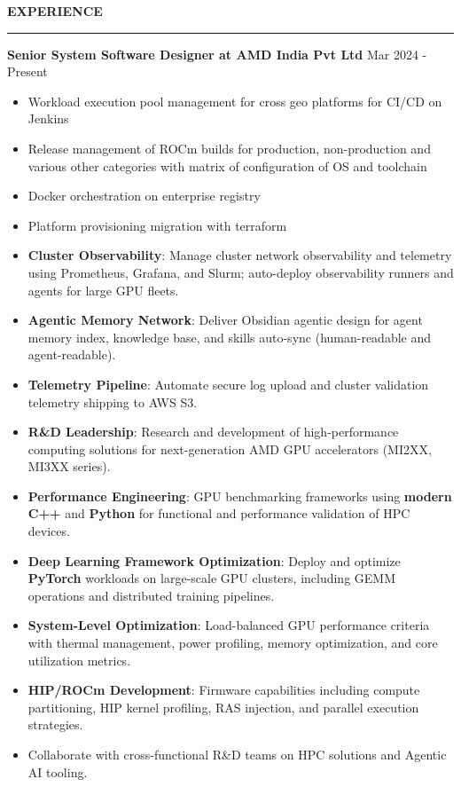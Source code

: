 \documentclass{resume} %
\renewenvironment{rSection}[1]{ %
  \sectionskip
  \textcolor{primaryColor}{\MakeUppercase{\bf #1}} %
  \sectionlineskip
  {\color{primaryColor}\hrule} %
  \begin{list}{}{ %
    \setlength{\leftmargin}{1.5em} %
  }
  \item[]
}{
  \end{list}
}
\begin{document}
\begin{rSection}{Experience}

{\textbf{\textcolor{accentColor}{Senior System Software Designer at AMD India Pvt Ltd}}} \hfill {Mar 2024 - Present }
\begin{itemize}
\if{}
    \item Workload execution pool management for cross geo platforms for CI/CD on Jenkins
    \item Release management of ROCm builds for production, non-production and various other categories with matrix of configuration of OS and toolchain
    \item Docker orchestration on enterprise registry
    \item Platform provisioning migration with terraform
\fi
    \item \textbf{Cluster Observability}: Manage cluster network observability and telemetry using Prometheus, Grafana, and Slurm; auto-deploy observability runners and agents for large GPU fleets.
    \item \textbf{Agentic Memory Network}: Deliver Obsidian agentic design for agent memory index, knowledge base, and skills auto-sync (human-readable and agent-readable).
    \item \textbf{Telemetry Pipeline}: Automate secure log upload and cluster validation telemetry shipping to AWS S3.
    \item \textbf{R\&D Leadership}: Research and development of high-performance computing solutions for next-generation AMD GPU accelerators (MI2XX, MI3XX series).
    \item \textbf{Performance Engineering}: GPU benchmarking frameworks using \textbf{modern C++} and \textbf{Python} for functional and performance validation of HPC devices.
    \item \textbf{Deep Learning Framework Optimization}: Deploy and optimize \textbf{PyTorch} workloads on large-scale GPU clusters, including GEMM operations and distributed training pipelines.
    \item \textbf{System-Level Optimization}: Load-balanced GPU performance criteria with thermal management, power profiling, memory optimization, and core utilization metrics.
    \item \textbf{HIP/ROCm Development}: Firmware capabilities including compute partitioning, HIP kernel profiling, RAS injection, and parallel execution strategies.
\if{}
    \item Collaborate with cross-functional R\&D teams on HPC solutions and Agentic AI tooling.
\fi
\end{itemize}


\end{rSection}
\end{document}
